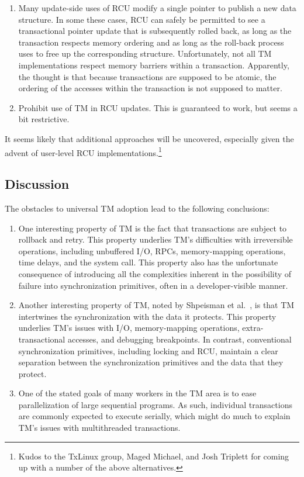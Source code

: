 \begin{enumerate}
\item	Many update-side uses of RCU modify a single pointer to publish
	a new data structure.
	In some these cases, RCU can safely be permitted to see a
	transactional pointer update that is subsequently rolled back,
	as long as the transaction respects memory ordering and as long
	as the roll-back process uses  to free up the
	corresponding structure.
	Unfortunately, not all TM implementations respect memory barriers
	within a transaction.
	Apparently, the thought is that because transactions are supposed
	to be atomic, the ordering of the accesses within the transaction
	is not supposed to matter.
\item	Prohibit use of TM in RCU updates.
	This is guaranteed to work, but seems a bit restrictive. 
\end{enumerate}

It seems likely that additional approaches will be uncovered, especially
given the advent of user-level RCU implementations.\footnote{
	Kudos to the TxLinux group, Maged Michael, and Josh Triplett
	for coming up with a number of the above alternatives.}

\subsection{Discussion}
\label{sec:future:Discussion}

The obstacles to universal TM adoption lead to the following
conclusions:

\begin{enumerate}
\item	One interesting property of TM is the fact that transactions are
	subject to rollback and retry.
	This property underlies TM's difficulties with irreversible
	operations, including unbuffered I/O, RPCs, memory-mapping
	operations, time delays, and the  system call.
	This property also has the unfortunate consequence of introducing
	all the complexities inherent in the possibility of
	failure into synchronization primitives, often in a developer-visible
	manner.
\item	Another interesting property of TM, noted by
	Shpeisman et al.~\cite{TatianaShpeisman2009CppTM}, is that TM
	intertwines the synchronization with the data it protects.
	This property underlies TM's issues with I/O, memory-mapping
	operations, extra-transactional accesses, and debugging
	breakpoints.
	In contrast, conventional synchronization primitives, including
	locking and RCU, maintain a clear separation between the
	synchronization primitives and the data that they protect.
\item	One of the stated goals of many workers in the TM area is to
	ease parallelization of large sequential programs.
	As such, individual transactions are commonly expected to
	execute serially, which might do much to explain TM's issues
	with multithreaded transactions.
\end{enumerate}

